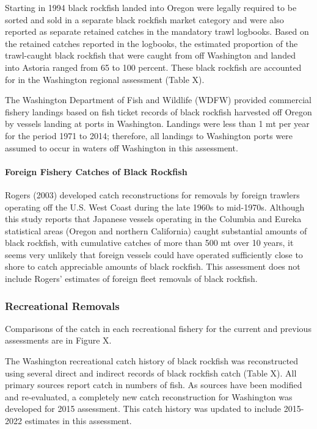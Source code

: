 \documentclass[11pt,
  english,
  letterpaper,
]{article}
\begin{document}
Starting in 1994 black rockfish landed into Oregon were legally required to be sorted and sold in a separate black rockfish market category and were also reported as separate retained catches in the mandatory trawl logbooks. Based on the retained catches reported in the logbooks, the estimated proportion of the trawl-caught black rockfish that were caught from off Washington and landed into Astoria ranged from 65 to 100 percent. These black rockfish are accounted for in the Washington regional assessment (Table X).

The Washington Department of Fish and Wildlife (WDFW) provided commercial fishery landings based on fish ticket records of black rockfish harvested off Oregon by vessels landing at ports in Washington. Landings were less than 1 mt per year for the period 1971 to 2014; therefore, all landings to Washington ports were assumed to occur in waters off Washington in this assessment.

\hypertarget{foreign-fishery-catches-of-black-rockfish}{%
\paragraph{Foreign Fishery Catches of Black Rockfish}\label{foreign-fishery-catches-of-black-rockfish}}

Rogers (2003) developed catch reconstructions for removals by foreign trawlers operating off the U.S. West Coast during the late 1960s to mid-1970s. Although this study reports that Japanese vessels operating in the Columbia and Eureka statistical areas (Oregon and northern California) caught substantial amounts of black rockfish, with cumulative catches of more than 500 mt over 10 years, it seems very unlikely that foreign vessels could have operated sufficiently close to shore to catch appreciable amounts of black rockfish. This assessment does not include Rogers' estimates of foreign fleet removals of black rockfish.

\hypertarget{recreational-removals}{%
\subsubsection{Recreational Removals}\label{recreational-removals}}

Comparisons of the catch in each recreational fishery for the current and previous assessments are in Figure X.

The Washington recreational catch history of black rockfish was reconstructed using several direct and indirect records of black rockfish catch (Table X). All primary sources report catch in numbers of fish. As sources have been modified and re-evaluated, a completely new catch reconstruction for Washington was developed for 2015 assessment. This catch history was updated to include 2015-2022 estimates in this assessment.
\end{document}
